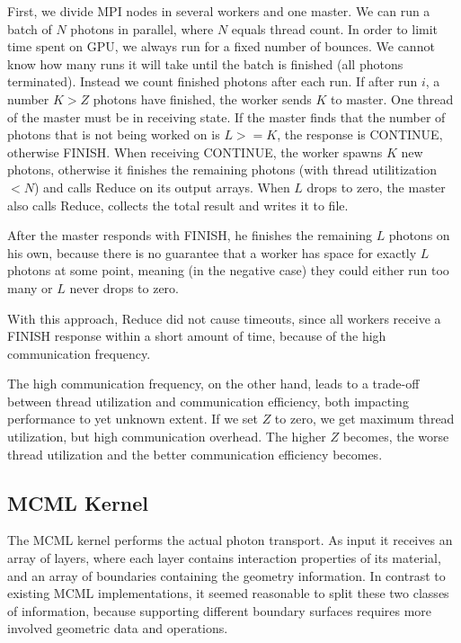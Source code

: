 \documentclass[]{article}
\begin{document}
First, we divide MPI nodes in several workers and one master. We can run a batch of $N$ photons in parallel, where $N$ equals thread count. In order to limit time spent on GPU, we always run for a fixed number of bounces. We cannot know how many runs it will take until the batch is finished (all photons terminated). Instead we count finished photons after each run. If after run $i$, a number $K > Z$ photons have finished, the worker sends $K$ to master. One thread of the master must be in receiving state. If the master finds that the number of photons that is not being worked on is $L >= K$, the response is CONTINUE, otherwise FINISH. When receiving CONTINUE, the worker spawns $K$ new photons, otherwise it finishes the remaining photons (with thread utilitization $< N$) and calls Reduce on its output arrays. When $L$ drops to zero, the master also calls Reduce, collects the total result and writes it to file.

After the master responds with FINISH, he finishes the remaining $L$ photons on his own, because there is no guarantee that a worker has space for exactly $L$ photons at some point, meaning (in the negative case) they could either run too many or $L$ never drops to zero.

With this approach, Reduce did not cause timeouts, since all workers receive a FINISH response within a short amount of time, because of the high communication frequency.

The high communication frequency, on the other hand, leads to a trade-off between thread utilization and communication efficiency, both impacting performance to yet unknown extent. If we set $Z$ to zero, we get maximum thread utilization, but high communication overhead. The higher $Z$ becomes, the worse thread utilization and the better communication efficiency becomes.

\subsection{MCML Kernel}
\label{impl:photon-transport}

The MCML kernel performs the actual photon transport. As input it receives an array of layers, where each layer contains interaction properties of its material, and an array of boundaries containing the geometry information. In contrast to existing MCML implementations, it seemed reasonable to split these two classes of information, because supporting different boundary surfaces requires more involved geometric data and operations.
\end{document}
